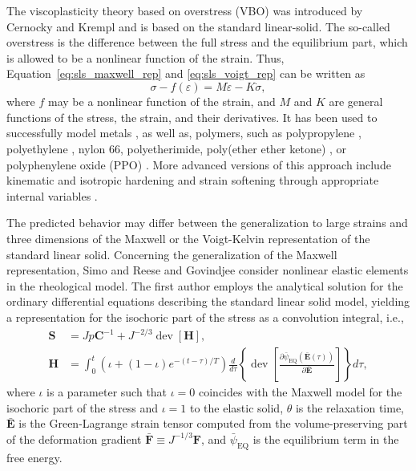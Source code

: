 The viscoplasticity theory based on overstress (VBO) was introduced by Cernocky and Krempl \citep{cernockyTheoryViscoplasticityBased1980} and is based on the standard linear-solid.
The so-called overstress is the difference between the full stress and the equilibrium part, which is allowed to be a nonlinear function of the strain.
Thus, Equation~\eqref{eq:sls_maxwell_rep} and \eqref{eq:sls_voigt_rep} can be written as
\begin{equation}
	\sigma - f(\varepsilon) = M\dot\varepsilon - K\dot \sigma,
\end{equation}
where $f$ may be a nonlinear function of the strain, and $M$ and $K$ are general functions of the stress, the strain, and their derivatives.
It has been used to successfully model metals \citep{liuUniaxialViscoplasticModel1979, yaoViscoplasticityTheoryBased1985}, as well as, polymers, such as polypropylene \citep{kitagawaRatedependentNonlinearConstitutive1989}, polyethylene \citep{kitagawaNonlinearConstitutiveEquation1990}, nylon 66, polyetherimide, poly(ether ether ketone) \citep{krempl2000overstress}, or polyphenylene oxide (PPO) \citep{colakModelingDeformationBehavior2005}.
More advanced versions of this approach include kinematic and isotropic hardening and strain softening through appropriate internal variables \citep{krempl2000overstress, hoExtensionViscoplasticityTheory2002}.

The predicted behavior may differ between the generalization to large strains and three dimensions of the Maxwell or the Voigt-Kelvin representation of the standard linear solid.
Concerning the generalization of the Maxwell representation, Simo \citep{simoFullyThreedimensionalFinitestrain1987} and Reese and Govindjee \citep{reeseTheoryFiniteViscoelasticity1998} consider nonlinear elastic elements in the rheological model.
The first author employs the analytical solution for the ordinary differential equations describing the standard linear solid model, yielding a representation for the isochoric part of the stress as a convolution integral, i.e.,
\begin{align}
	\bm S &= Jp\bm C^{-1} + J^{-2/3}\operatorname{dev}[\bm H],\\
	\bm H &= \int_0^t (\iota + (1-\iota)e^{-(t-\tau)/T}) \frac{d}{d\tau}\left\{\operatorname{dev} \left[\frac{\partial {\bar\psi}_\text{EQ}(\bar{\bm E}(\tau))}{\partial \bar{\bm E}}\right]\right\}  d\tau,
\end{align}
where $\iota$ is a parameter such that $\iota=0$ coincides with the Maxwell model for the isochoric part of the stress and $\iota=1$ to the elastic solid, $\theta$ is the relaxation time, $\bar{\bm E}$ is the Green-Lagrange strain tensor computed from the volume-preserving part of the deformation gradient $\bar{\bm F} \equiv J^{-1/3} \bm F$, and $\bar{\psi	}_\text{EQ}$ is the equilibrium term in the free energy.

